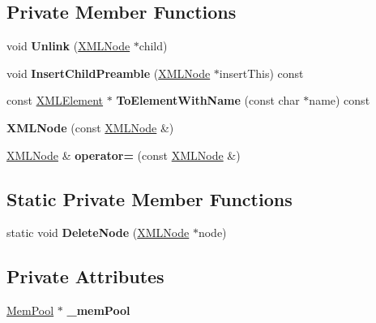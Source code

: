\subsection*{Private Member Functions}
\begin{DoxyCompactItemize}
\item 
\mbox{\label{classtinyxml2_1_1XMLNode_a9546e242b6a4f232415befb1cfe0fdd4}} 
void {\bfseries Unlink} (\mbox{\hyperlink{classtinyxml2_1_1XMLNode}{X\+M\+L\+Node}} $\ast$child)
\item 
\mbox{\label{classtinyxml2_1_1XMLNode_a0fd4d2e88fb22d46b5b1474b5b786e35}} 
void {\bfseries Insert\+Child\+Preamble} (\mbox{\hyperlink{classtinyxml2_1_1XMLNode}{X\+M\+L\+Node}} $\ast$insert\+This) const
\item 
\mbox{\label{classtinyxml2_1_1XMLNode_a4e61e7c5c69c1f92e2aa4276ad18d775}} 
const \mbox{\hyperlink{classtinyxml2_1_1XMLElement}{X\+M\+L\+Element}} $\ast$ {\bfseries To\+Element\+With\+Name} (const char $\ast$name) const
\item 
\mbox{\label{classtinyxml2_1_1XMLNode_a78be01384518a969da905548f318d75b}} 
{\bfseries X\+M\+L\+Node} (const \mbox{\hyperlink{classtinyxml2_1_1XMLNode}{X\+M\+L\+Node}} \&)
\item 
\mbox{\label{classtinyxml2_1_1XMLNode_ade79231d908e1f21862819e00e56ab6e}} 
\mbox{\hyperlink{classtinyxml2_1_1XMLNode}{X\+M\+L\+Node}} \& {\bfseries operator=} (const \mbox{\hyperlink{classtinyxml2_1_1XMLNode}{X\+M\+L\+Node}} \&)
\end{DoxyCompactItemize}
\subsection*{Static Private Member Functions}
\begin{DoxyCompactItemize}
\item 
\mbox{\label{classtinyxml2_1_1XMLNode_af86facb14f441c2b91f3518f106dc943}} 
static void {\bfseries Delete\+Node} (\mbox{\hyperlink{classtinyxml2_1_1XMLNode}{X\+M\+L\+Node}} $\ast$node)
\end{DoxyCompactItemize}
\subsection*{Private Attributes}
\begin{DoxyCompactItemize}
\item 
\mbox{\label{classtinyxml2_1_1XMLNode_a4e3ff179bc312480b6bc3e57014834f7}} 
\mbox{\hyperlink{classtinyxml2_1_1MemPool}{Mem\+Pool}} $\ast$ {\bfseries \+\_\+mem\+Pool}
\end{DoxyCompactItemize}
